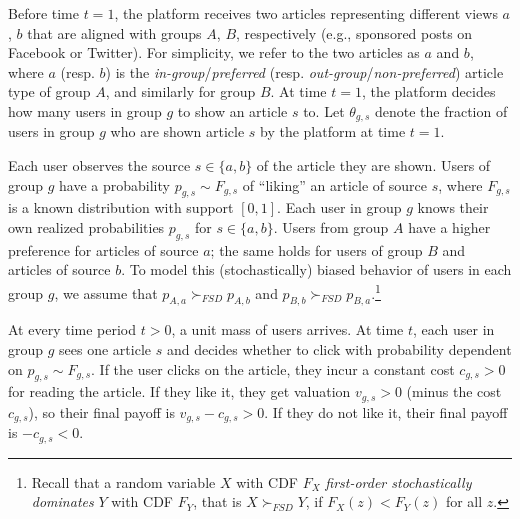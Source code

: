 \documentclass[letterpaper]{article} %
\begin{document}
Before time $t=1$, the platform receives two articles representing different views $a$, $b$ that are aligned with groups $A$, $B$, respectively (e.g., sponsored posts on Facebook or Twitter).
%
For simplicity, we refer to the two articles as $a$ and $b$, where $a$ (resp. $b$) is the \emph{in-group}/\emph{preferred} (resp. \emph{out-group}/\emph{non-preferred}) article type of group $A$, and similarly for group $B$.
%
At time $t=1$, the platform decides how many users in group $g$ to show an article $s$ to. 
%
Let $\theta_{g,s}$  denote the fraction of users in group $g$ who are shown article $s$ by the platform at time $t=1$.

Each user observes the source $s\in\{a,b\}$ of the article they are shown.
%
Users of group $g$ have a probability $p_{g,s} \sim F_{g,s}$ of ``liking'' an article of source $s$, where $F_{g,s}$ is a known distribution with support $[0,1]$. 
% 
Each user in group $g$ %
knows their own realized probabilities $p_{g,s}$ for $s \in \{a,b\}$.
%
Users from group $A$ have a higher preference for articles of source $a$; the same holds for users of group $B$ and articles of source $b$.
%
To model this (stochastically) biased behavior of users in each group $g$, we assume that $p_{A,a} \succ_{FSD} p_{A, b}$ and $p_{B,b} \succ_{FSD} p_{B, a}$.\footnote{Recall that a random variable $X$ with CDF $F_X$ \textit{first-order stochastically dominates} $Y$ with CDF $F_Y$, that is $X \succ_{FSD} Y$, if $F_X(z) < F_Y(z)$ for all $z$.}

At every time period $t >0$, a unit mass of users arrives.
%
At time $t$, each user in group $g$ sees one article $s$ and decides whether to click with probability dependent on $p_{g,s} \sim F_{g,s}$.
%
If the user clicks on the article, they incur a constant cost $c_{g,s}>0$ for reading the article.
%
If they like it, they get valuation $v_{g,s}>0$ (minus the cost $c_{g,s}$), so their final payoff is $v_{g,s}-c_{g,s}>0$. 
%
If they do not like it, their final payoff is $-c_{g,s}<0$.
\end{document}
